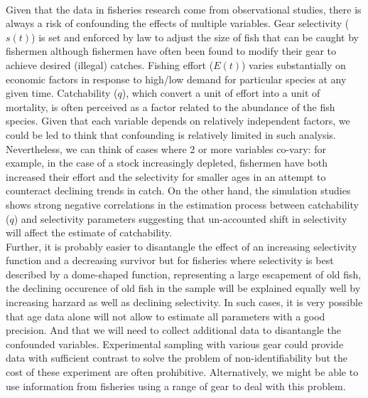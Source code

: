 \documentclass[11pt]{article}
\begin{document}
\begin{spacing}{1.2}
 \\
Given that the data in fisheries research come from observational studies, there is always a risk of confounding the effects of multiple variables. Gear selectivity ($s(t)$) is set and enforced by law to adjust the size of fish that can be caught by fishermen although fishermen have often been found to modify their gear to achieve desired (illegal) catches. Fishing effort ($E(t)$) varies substantially on economic factors in response to high/low demand for particular species at any given time. Catchability ($q$), which convert a unit of effort into a unit of mortality, is often perceived as a factor related to the abundance of the fish species. Given that each variable depends on relatively independent factors, we could be led to think that confounding is relatively limited in such analysis. Nevertheless, we can think of cases where 2 or more variables co-vary: for example, in the case of a stock increasingly depleted, fishermen have both increased their effort and the selectivity for smaller ages in an attempt to counteract declining trends in catch. On the other hand, the simulation studies shows strong negative correlations in the estimation process between catchability ($q$) and selectivity parameters suggesting that un-accounted shift in selectivity will affect the estimate of catchability.\\

Further, it is probably easier to disantangle the effect of an increasing selectivity function and a decreasing survivor but for fisheries where selectivity is best described by a dome-shaped function, representing a large escapement of old fish, the declining occurence of old fish in the sample will be explained equally well by increasing harzard as well as declining selectivity. In such cases, it is very possible that age data alone will not allow to estimate all parameters with a good precision. And that we will need to collect additional data to disantangle the confounded variables. Experimental sampling with various gear could provide data with sufficient contrast to solve the problem of non-identifiability but the cost of these experiment are often prohibitive. Alternatively, we might be able to use information from fisheries using a range of gear to deal with this problem.\\


\end{spacing}
\end{document}
